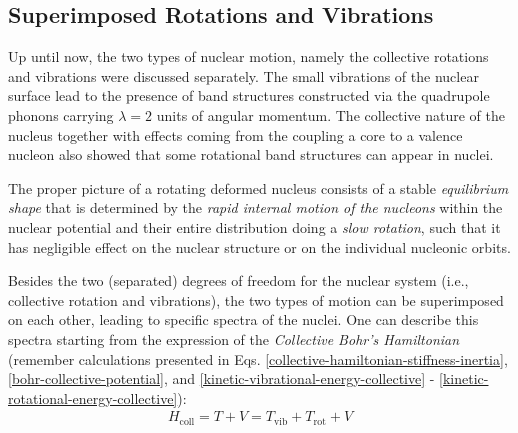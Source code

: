 \subsection{Superimposed Rotations and Vibrations}

Up until now, the two types of nuclear motion, namely the collective rotations and vibrations were discussed separately. The small vibrations of the nuclear surface lead to the presence of band structures constructed via the quadrupole phonons carrying $\lambda=2$ units of angular momentum. The collective nature of the nucleus together with effects coming from the coupling a core to a valence nucleon also showed that some rotational band structures can appear in nuclei.

The proper picture of a rotating deformed nucleus consists of a stable \emph{equilibrium shape} that is determined by the \emph{rapid internal motion of the nucleons} within the nuclear potential and their entire distribution doing a \emph{slow rotation}, such that it has negligible effect on the nuclear structure or on the individual nucleonic orbits.

Besides the two (separated) degrees of freedom for the nuclear system (i.e., collective rotation and vibrations), the two types of motion can be superimposed on each other, leading to specific spectra of the nuclei. One can describe this spectra starting from the expression of the \emph{Collective Bohr's Hamiltonian} (remember calculations presented in Eqs. \ref{collective-hamiltonian-stiffness-inertia}, \ref{bohr-collective-potential}, and \ref{kinetic-vibrational-energy-collective} - \ref{kinetic-rotational-energy-collective}):
\begin{align}
    H_\text{coll}=T+V=T_\text{vib}+T_\text{rot}+V
\end{align}

